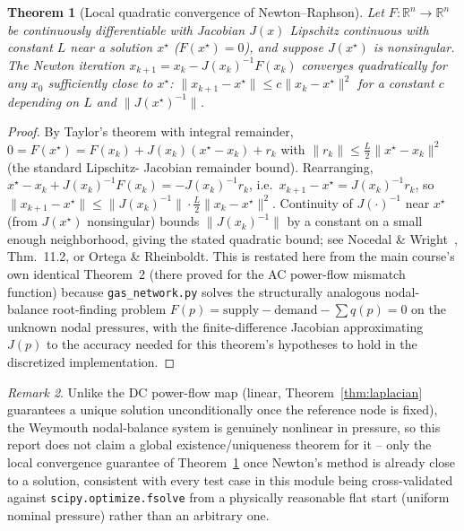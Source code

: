 \documentclass[11pt]{report}
\newcommand{\pkg}[1]{\texttt{#1}}
\theoremstyle{plain}
\newtheorem{theorem}{Theorem}[chapter]
\theoremstyle{definition}
\theoremstyle{remark}
\newtheorem{remark}[theorem]{Remark}
\begin{document}
\begin{theorem}[Local quadratic convergence of Newton--Raphson]
\label{thm:newton}
Let $F:\mathbb{R}^n\to\mathbb{R}^n$ be continuously differentiable with
Jacobian $J(x)$ Lipschitz continuous with constant $L$ near a solution
$x^\star$ ($F(x^\star)=0$), and suppose $J(x^\star)$ is nonsingular. The
Newton iteration $x_{k+1}=x_k-J(x_k)^{-1}F(x_k)$ converges
\emph{quadratically} for any $x_0$ sufficiently close to $x^\star$:
$\|x_{k+1}-x^\star\|\le c\|x_k-x^\star\|^2$ for a constant $c$ depending
on $L$ and $\|J(x^\star)^{-1}\|$.
\end{theorem}
\begin{proof}
By Taylor's theorem with integral remainder,
$0=F(x^\star)=F(x_k)+J(x_k)(x^\star-x_k)+r_k$ with
$\|r_k\|\le\tfrac{L}{2}\|x^\star-x_k\|^2$ (the standard Lipschitz-
Jacobian remainder bound). Rearranging,
$x^\star-x_k+J(x_k)^{-1}F(x_k)=-J(x_k)^{-1}r_k$, i.e.\
$x_{k+1}-x^\star=J(x_k)^{-1}r_k$, so $\|x_{k+1}-x^\star\|\le
\|J(x_k)^{-1}\|\cdot\tfrac{L}{2}\|x_k-x^\star\|^2$. Continuity of
$J(\cdot)^{-1}$ near $x^\star$ (from $J(x^\star)$ nonsingular) bounds
$\|J(x_k)^{-1}\|$ by a constant on a small enough neighborhood, giving
the stated quadratic bound; see Nocedal \&
Wright~\cite{nocedalwright}, Thm.~11.2, or Ortega \& Rheinboldt. This is
restated here from the main course's own identical Theorem~2 (there
proved for the AC power-flow mismatch function) because
\pkg{gas\_\hspace{0pt}network.py} solves the structurally analogous nodal-balance
root-finding problem $F(p)=\text{supply}-\text{demand}-\sum q(p)=0$ on
the unknown nodal pressures, with the finite-difference Jacobian
approximating $J(p)$ to the accuracy needed for this theorem's
hypotheses to hold in the discretized implementation.
\end{proof}

\begin{remark}
Unlike the DC power-flow map (linear, Theorem~\ref{thm:laplacian}
guarantees a unique solution unconditionally once the reference node is
fixed), the Weymouth nodal-balance system is
genuinely nonlinear in pressure, so this report does not claim a
global existence/uniqueness theorem for it -- only the local
convergence guarantee of Theorem~\ref{thm:newton} once Newton's method
is already close to a solution, consistent with every test case in this
module being cross-validated against \texttt{scipy.optimize.fsolve}
from a physically reasonable flat start (uniform nominal pressure)
rather than an arbitrary one.
\end{remark}
\end{document}
